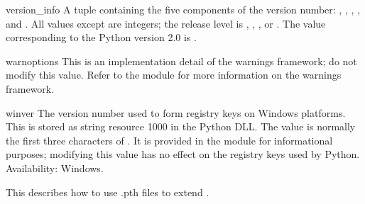 \begin{datadesc}{version_info}
  A tuple containing the five components of the version number:
  , , , , and
  .  All values except  are integers;
  the release level is , ,
  , or .  The 
  value corresponding to the Python version 2.0 is .
\end{datadesc}

\begin{datadesc}{warnoptions}
  This is an implementation detail of the warnings framework; do not
  modify this value.  Refer to the  module for
  more information on the warnings framework.
\end{datadesc}

\begin{datadesc}{winver}
  The version number used to form registry keys on Windows platforms.
  This is stored as string resource 1000 in the Python DLL.  The value
  is normally the first three characters of .  It is
  provided in the  module for informational purposes;
  modifying this value has no effect on the registry keys used by
  Python.
  Availability: Windows.
\end{datadesc}


\begin{seealso}
    {This describes how to use .pth files to extend .}
\end{seealso}
